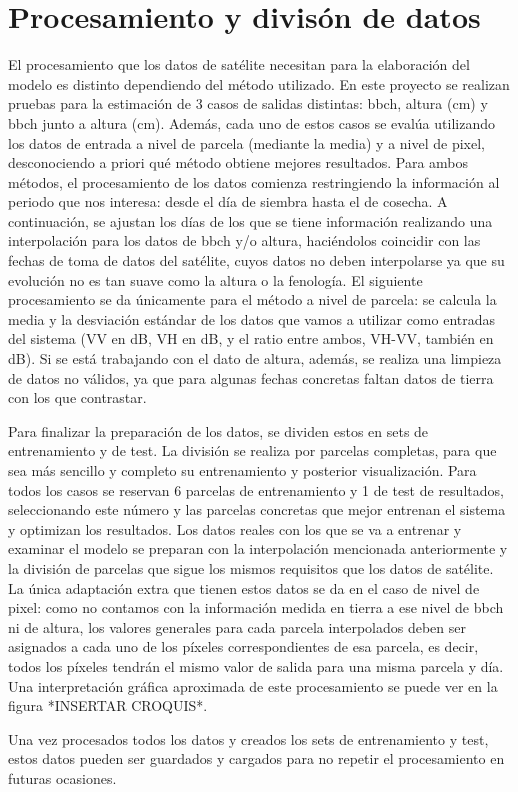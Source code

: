 \section{Procesamiento y divisón de datos}
\par  El procesamiento que los datos de satélite necesitan para la elaboración del modelo es distinto dependiendo del método utilizado. En este proyecto se realizan pruebas para la estimación de 3 casos de salidas distintas: \gls{bbch}, altura (cm) y \gls{bbch} junto a altura (cm). Además, cada uno de estos casos se evalúa utilizando los datos de entrada a nivel de parcela (mediante la media) y a nivel de pixel, desconociendo a priori qué método obtiene mejores resultados. Para ambos métodos, el procesamiento de los datos comienza restringiendo la información al periodo que nos interesa: desde el día de siembra hasta el de cosecha. A continuación, se ajustan los días de los que se tiene información realizando una interpolación para los datos de \gls{bbch} y/o altura, haciéndolos coincidir con las fechas de toma de datos del satélite, cuyos datos no deben interpolarse ya que su evolución no es tan suave como la altura o la fenología. El siguiente procesamiento se da únicamente para el método a nivel de parcela: se calcula la media y la desviación estándar de los datos que vamos a utilizar como entradas del sistema (VV en dB, VH en dB, y el ratio entre ambos, VH-VV, también en dB). Si se está trabajando con el dato de altura, además, se realiza una limpieza de datos no válidos, ya que para algunas fechas concretas faltan datos de tierra con los que contrastar. 
\\
\par Para finalizar la preparación de los datos, se dividen estos en sets de entrenamiento y de test. La división se realiza por parcelas completas, para que sea más sencillo y completo su entrenamiento y posterior visualización. Para todos los casos se reservan 6 parcelas de entrenamiento y 1 de test de resultados, seleccionando este número y las parcelas concretas que mejor entrenan el sistema y optimizan los resultados. Los datos reales con los que se va a entrenar y examinar el modelo se preparan con la interpolación mencionada anteriormente y la división de parcelas que sigue los mismos requisitos que los datos de satélite. La única adaptación extra que tienen estos datos se da en el caso de nivel de pixel: como no contamos con la información medida en tierra a ese nivel de \gls{bbch} ni de altura, los valores generales para cada parcela interpolados deben ser asignados a cada uno de los píxeles correspondientes de esa parcela, es decir, todos los píxeles tendrán el mismo valor de salida para una misma parcela y día. Una interpretación gráfica aproximada de este procesamiento se puede ver en la figura *INSERTAR CROQUIS*.
\\
\par Una vez procesados todos los datos y creados los sets de entrenamiento y test, estos datos pueden ser guardados y cargados para no repetir el procesamiento en futuras ocasiones.
